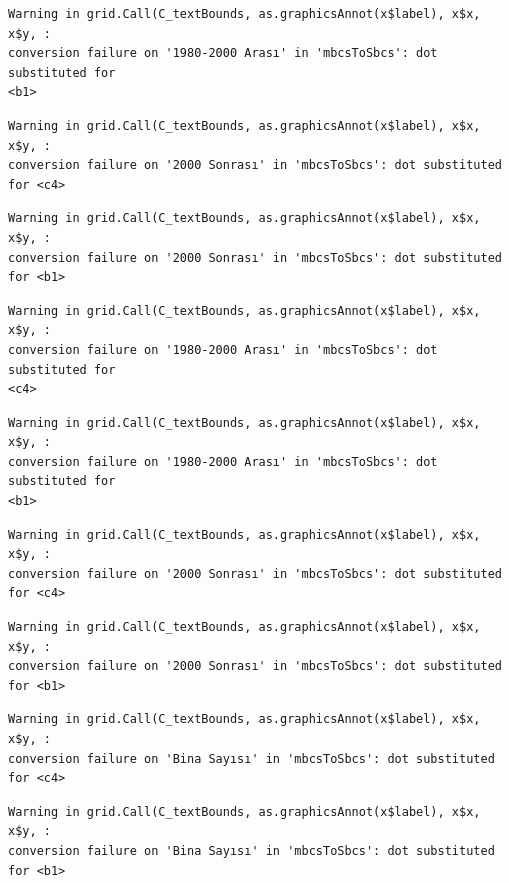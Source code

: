 \documentclass[
  11pt,
  a4paper,
  DIV=11,
  numbers=noendperiod]{scrartcl}
\begin{document}
\begin{verbatim}
Warning in grid.Call(C_textBounds, as.graphicsAnnot(x$label), x$x, x$y, :
conversion failure on '1980-2000 Arası' in 'mbcsToSbcs': dot substituted for
<b1>
\end{verbatim}

\begin{verbatim}
Warning in grid.Call(C_textBounds, as.graphicsAnnot(x$label), x$x, x$y, :
conversion failure on '2000 Sonrası' in 'mbcsToSbcs': dot substituted for <c4>
\end{verbatim}

\begin{verbatim}
Warning in grid.Call(C_textBounds, as.graphicsAnnot(x$label), x$x, x$y, :
conversion failure on '2000 Sonrası' in 'mbcsToSbcs': dot substituted for <b1>
\end{verbatim}

\begin{verbatim}
Warning in grid.Call(C_textBounds, as.graphicsAnnot(x$label), x$x, x$y, :
conversion failure on '1980-2000 Arası' in 'mbcsToSbcs': dot substituted for
<c4>
\end{verbatim}

\begin{verbatim}
Warning in grid.Call(C_textBounds, as.graphicsAnnot(x$label), x$x, x$y, :
conversion failure on '1980-2000 Arası' in 'mbcsToSbcs': dot substituted for
<b1>
\end{verbatim}

\begin{verbatim}
Warning in grid.Call(C_textBounds, as.graphicsAnnot(x$label), x$x, x$y, :
conversion failure on '2000 Sonrası' in 'mbcsToSbcs': dot substituted for <c4>
\end{verbatim}

\begin{verbatim}
Warning in grid.Call(C_textBounds, as.graphicsAnnot(x$label), x$x, x$y, :
conversion failure on '2000 Sonrası' in 'mbcsToSbcs': dot substituted for <b1>
\end{verbatim}

\begin{verbatim}
Warning in grid.Call(C_textBounds, as.graphicsAnnot(x$label), x$x, x$y, :
conversion failure on 'Bina Sayısı' in 'mbcsToSbcs': dot substituted for <c4>
\end{verbatim}

\begin{verbatim}
Warning in grid.Call(C_textBounds, as.graphicsAnnot(x$label), x$x, x$y, :
conversion failure on 'Bina Sayısı' in 'mbcsToSbcs': dot substituted for <b1>
\end{verbatim}
\end{document}
